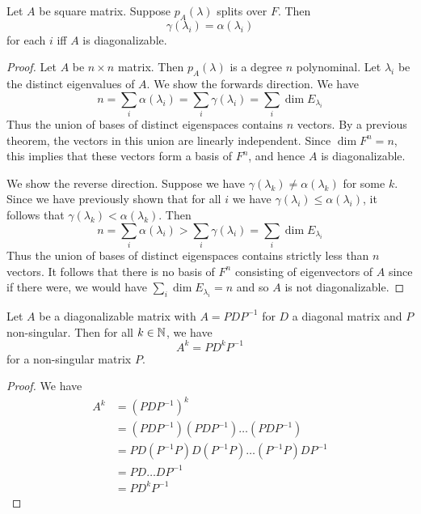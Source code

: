 \documentclass{article}
\begin{document}
    \begin{cthm}
      Let $A$ be square matrix. Suppose $p_A(\lambda)$ splits over $F$. Then \[
        \gamma(\lambda_i) = \alpha(\lambda_i)
      \] for each $i$ iff $A$ is diagonalizable.
    \end{cthm}
    \begin{proof}
      Let $A$ be $n \times n$ matrix. Then $p_A(\lambda)$ is a degree $n$ polynominal. Let $\lambda_i$ be the distinct eigenvalues of $A$. We show the forwards direction. We have \[
        n = \sum_i \alpha(\lambda_i) = \sum_i \gamma(\lambda_i) = \sum_i \dim E_{\lambda_i}
      \]
      Thus the union of bases of distinct eigenspaces contains $n$ vectors. By a previous theorem, the vectors in this union are linearly independent. Since $\dim F^n = n$, this implies that these vectors form a basis of $F^n$, and hence $A$ is diagonalizable.

      We show the reverse direction. Suppose we have $\gamma(\lambda_k) \neq \alpha(\lambda_k)$ for some $k$. Since we have previously shown that for all $i$ we have $\gamma(\lambda_i) \leq \alpha(\lambda_i)$, it follows that $\gamma(\lambda_k) < \alpha(\lambda_k)$. Then \[
        n = \sum_i \alpha(\lambda_i) > \sum_i \gamma(\lambda_i) = \sum_i \dim E_{\lambda_i}
      \]
      Thus the union of bases of distinct eigenspaces contains strictly less than $n$ vectors. It follows that there is no basis of $F^n$ consisting of eigenvectors of $A$ since if there were, we would have $\sum_i \dim E_{\lambda_i} = n$ and so $A$ is not diagonalizable.
    \end{proof}
    \begin{theorem}
      Let $A$ be a diagonalizable matrix with $A = PDP^{-1}$ for $D$ a diagonal matrix and $P$ non-singular. Then for all $k \in \mathbb{N}$, we have \[
        A^k = PD^kP^{-1}
      \] for a non-singular matrix $P$.
    \end{theorem}
    \begin{proof}
      We have
      \begin{align*}
        A^k &= (PDP^{-1})^k\\
        &= (PDP^{-1})(PDP^{-1})\dots(PDP^{-1})\\
        &= PD(P^{-1}P)D(P^{-1}P)\dots(P^{-1}P)DP^{-1}\\
        &= PD\dots DP^{-1}\\
        &= PD^kP^{-1}
      \end{align*}
    \end{proof}
\end{document}
